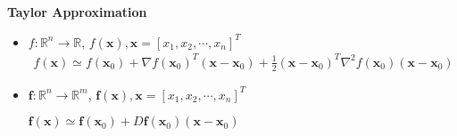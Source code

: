 {\LARGE \textbf{Taylor Approximation}}

\begin{itemize}
\item $f: \mathbb{R}^{n} \rightarrow \mathbb{R}$, $f(\boldsymbol{x}), \boldsymbol{x}=\left[x_{1}, x_{2}, \cdots, x_{n}\right]^{T}$
{\footnotesize \begin{align*}
    f(\bm{x}) \simeq f \left(\bm{x}_{0}\right)+\nabla f\left(\bm{x}_{0}\right)^{T}\left(\bm{x}-\bm{x}_{0}\right)  +\frac{1}{2}\left(\bm{x}-\bm{x}_{0}\right)^{T} \nabla^{2} f\left(\bm{x}_{0}\right)\left(\bm{x}-\bm{x}_{0}\right)
\end{align*}}


\item $\bm{f}: \mathbb{R}^{n} \rightarrow \mathbb{R}^{m}$, $\bm{f}(\boldsymbol{x}), \boldsymbol{x}=\left[x_{1}, x_{2}, \cdots, x_{n}\right]^{T}$

$\bm{f}({\bm{x}}) \simeq \bm{f}\left( {{{\bm{x}}_0}} \right) + D \bm{f}\left( {{{\bm{x}}_0}} \right)\left( {{\bm{x}} - {{\bm{x}}_0}} \right)$

\end{itemize}











